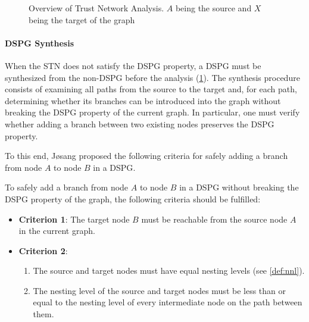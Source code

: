 \begin{figure}
    \centering
    \caption{Overview of Trust Network Analysis. \(A\) being the source and \(X\) being the target of the graph}
    \label{fig:dspg_synth_analyse}
\end{figure}
\paragraph{\ac{DSPG} Synthesis}

When the \ac{STN} does not satisfy the \ac{DSPG} property, a \ac{DSPG} must be synthesized from the non-\ac{DSPG} before the analysis (\cref{fig:dspg_synth_analyse}). 
The synthesis procedure consists of examining all paths from the source to the target and, for each path, determining whether its branches can be introduced into the graph without breaking the \ac{DSPG} property of the current graph. In particular, one must verify whether adding a branch between two existing nodes preserves the \ac{DSPG} property.

To this end, J{\o}sang proposed the following criteria for safely adding a branch from node $A$ to node $B$ in a \ac{DSPG}.

\begin{definition}
\label{def:dspg_original_criteria}
To safely add a branch from node $A$ to node $B$ in a \ac{DSPG} without breaking the \ac{DSPG} property of the graph, the following criteria should be fulfilled:
\begin{itemize}
    \item \textbf{Criterion 1}: The target node $B$ must be reachable from the source node $A$ in the current graph.
    \item \textbf{Criterion 2}: 
    \begin{enumerate}
    
    \item \label{rule:2}The source and target nodes must have equal nesting levels (see \cref{def:nnl}).
    \item \label{rule:3}The nesting level of the source and target nodes must be less than or equal to the nesting level of every intermediate node on the path between them.
\end{enumerate}
\end{itemize}
    
\end{definition}

